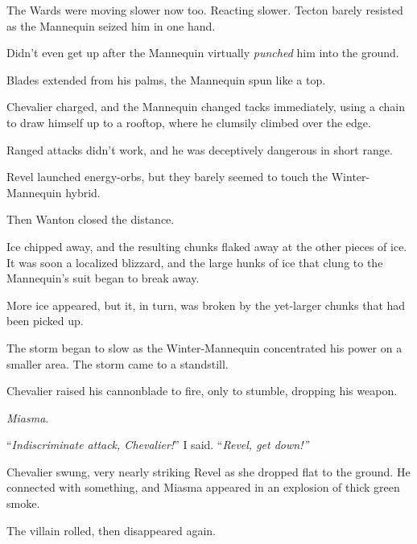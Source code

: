 The Wards were moving slower now too.  Reacting slower.  Tecton barely resisted as the Mannequin seized him in one hand.



Didn't even get up after the Mannequin virtually \emph{punched} him into the ground.



Blades extended from his palms, the Mannequin spun like a top.



Chevalier charged, and the Mannequin changed tacks immediately, using a chain to draw himself up to a rooftop, where he clumsily climbed over the edge.



Ranged attacks didn't work, and he was deceptively dangerous in short range.



Revel launched energy-orbs, but they barely seemed to touch the Winter-Mannequin hybrid.



Then Wanton closed the distance.



Ice chipped away, and the resulting chunks flaked away at the other pieces of ice.  It was soon a localized blizzard, and the large hunks of ice that clung to the Mannequin's suit began to break away.



More ice appeared, but it, in turn, was broken by the yet-larger chunks that had been picked up.



The storm began to slow as the Winter-Mannequin concentrated his power on a smaller area.  The storm came to a standstill.



Chevalier raised his cannonblade to fire, only to stumble, dropping his weapon.



\emph{Miasma}.



``\emph{Indiscriminate attack, Chevalier!}'' I said.  ``\emph{Revel, get down!''}



Chevalier swung, very nearly striking Revel as she dropped flat to the ground.  He connected with something, and Miasma appeared in an explosion of thick green smoke.



The villain rolled, then disappeared again.



